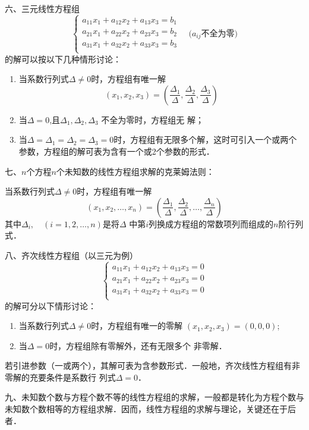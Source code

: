 六、三元线性方程组
\[\begin{cases}
    a_{11}x_1+a_{12}x_2+a_{13}x_3=b_1\\
    a_{21}x_1+a_{22}x_2+a_{23}x_3=b_2\\
    a_{31}x_1+a_{32}x_2+a_{33}x_3=b_3\\
\end{cases}\quad \text{($a_{ij}$不全为零)}\]
的解可以按以下几种情形讨论：
\begin{enumerate}
    \item 当系数行列式$\Delta \ne 0$时，方程组有唯一解
\[(x_1,x_2,x_3)=\left(\frac{\Delta_1}{\Delta},\frac{\Delta_2}{\Delta},\frac{\Delta_3}{\Delta}\right)\]
\item 当$\Delta =0$,且$\Delta_1 ,\Delta_2 ,\Delta_3$ 不全为零时，方程组无
解；
\item 当$\Delta =\Delta_1 =\Delta_2 =\Delta_3 =0$时，方程组有无限多个解，这时可引入一个或两个参数，方程组的解可表为含有一个或2个参数的形式．
\end{enumerate}

七、$n$个方程$n$个未知数的线性方程组求解的克莱姆法则：

当系数行列式$\Delta \ne 0$时，方程组有唯一解
\[(x_1,x_2,\ldots,x_n)=\left(\frac{\Delta_1}{\Delta},\frac{\Delta_2}{\Delta},\ldots,\frac{\Delta_n}{\Delta}\right)\]
其中$\Delta_i,\quad (i=1, 2,\ldots,n)$是将$\Delta$ 中第$i$列换成方程组的常数项列而组成的$n$阶行列式．

八、齐次线性方程组（以三元为例）
\[\begin{cases}
    a_{11}x_1+a_{12}x_2+a_{13}x_3=0\\
    a_{21}x_1+a_{22}x_2+a_{23}x_3=0\\
    a_{31}x_1+a_{32}x_2+a_{33}x_3=0\\
\end{cases}\]
的解可分以下情形讨论：
\begin{enumerate}
    \item 当系数行列式$\Delta \ne 0$时，方程组有唯一的零解
$(x_1, x_2, x_3) = (0, 0, 0)$;
\item 当$\Delta =0$时，方程组除有零解外，还有无限多个
非零解．
\end{enumerate}

若引进参数（一或两个），其解可表为含参数形式．一般地，齐次线性方程组有非零解的充要条件是系数行
列式$\Delta =0$．

九、未知数个数与方程个数不等的线性方程组的求解，一般都是转化为方程个数与未知数个数相等的方程组求解．因而，线性方程组的求解与理论，关键还在于后者．



